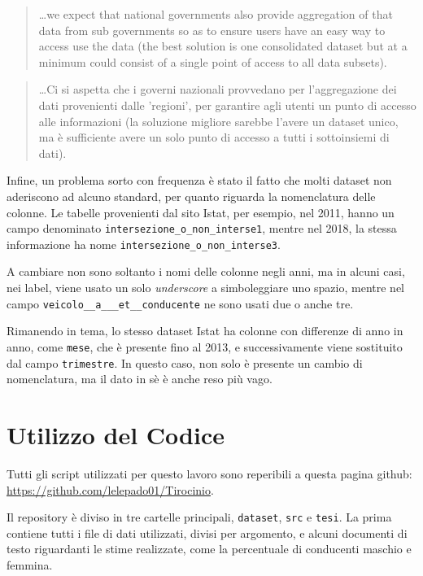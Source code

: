 \documentclass[a4paper,12pt]{report}
\newcommand{\columnstyle}[1]{\texttt{#1}}
\newcommand{\filenamestyle}[1]{\texttt{#1}}
\newcommand{\quotestyle}[1]{\textit{#1}}
\newcommand{\skipline}{\vspace{0.2in}}
\begin{document}
\begin{quotation}
    \dots we expect that national governments also provide aggregation 
    of that data from 
    sub governments so as to ensure users have an easy way to access use the data 
    (the best solution is one consolidated dataset but at a minimum could consist of a 
    single point of access to all data subsets).\cite{OPENDATAINDEX:1}
\end{quotation}

\begin{quotation}
    \dots Ci si aspetta che i governi nazionali provvedano per 
    l'aggregazione dei dati provenienti dalle 'regioni', per garantire agli utenti 
    un punto di accesso 
    alle informazioni (la soluzione migliore sarebbe l'avere un dataset unico, ma è sufficiente 
    avere un solo punto di accesso a tutti i sottoinsiemi di dati). 
\end{quotation}

\skipline
Infine, un problema sorto con frequenza è stato il fatto che 
molti dataset non aderiscono ad 
alcuno standard, per quanto riguarda la nomenclatura delle colonne. 
Le tabelle provenienti dal sito Istat, per esempio, nel 2011, hanno un campo denominato 
\columnstyle{intersezione\_o\_non\_interse1}, mentre nel 2018, la stessa informazione ha 
nome \columnstyle{intersezione\_o\_non\_interse3}. 

A cambiare non sono soltanto i nomi delle colonne negli anni, 
ma in alcuni casi, nei label, viene usato un solo \quotestyle{underscore} a 
simboleggiare uno spazio, mentre nel campo \columnstyle{veicolo\_\_a\_\_\_et\_\_conducente} 
ne sono usati due o anche tre. 

Rimanendo in tema, lo stesso dataset Istat ha colonne con differenze di anno in anno, 
come \columnstyle{mese}, che è presente fino al 2013, e successivamente viene 
sostituito dal campo \columnstyle{trimestre}. 
In questo caso, non solo è presente un cambio di nomenclatura, ma il dato in sè è 
anche reso più vago. 

\chapter{Utilizzo del Codice}

Tutti gli script utilizzati per questo lavoro sono reperibili a questa pagina 
github: \url{https://github.com/lelepado01/Tirocinio}. 

Il repository è diviso in tre cartelle principali, \filenamestyle{dataset}, \filenamestyle{src} 
e \filenamestyle{tesi}. La prima contiene tutti i file di dati utilizzati, divisi per 
argomento, e alcuni documenti di testo riguardanti le stime realizzate, come la percentuale di 
conducenti maschio e femmina. 
\end{document}
